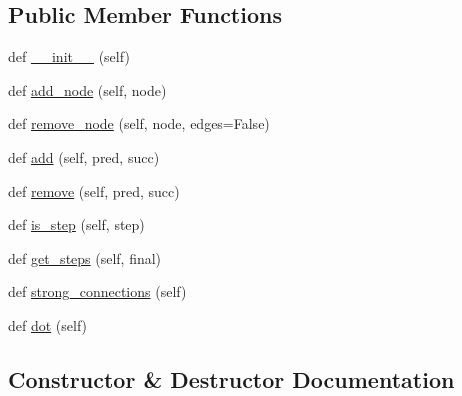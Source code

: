 \subsection*{Public Member Functions}
\begin{DoxyCompactItemize}
\item 
def \hyperlink{classpip_1_1__vendor_1_1distlib_1_1util_1_1Sequencer_af2a6b5cfce15112bafad00ed20bbfcce}{\+\_\+\+\_\+init\+\_\+\+\_\+} (self)
\item 
def \hyperlink{classpip_1_1__vendor_1_1distlib_1_1util_1_1Sequencer_a0ded535de1742bae3f41bfe634e74a4e}{add\+\_\+node} (self, node)
\item 
def \hyperlink{classpip_1_1__vendor_1_1distlib_1_1util_1_1Sequencer_a23f9b0df51114ed834d6ebb1e8c2fe07}{remove\+\_\+node} (self, node, edges=False)
\item 
def \hyperlink{classpip_1_1__vendor_1_1distlib_1_1util_1_1Sequencer_a233a50f436076c741b223f7fe801f53e}{add} (self, pred, succ)
\item 
def \hyperlink{classpip_1_1__vendor_1_1distlib_1_1util_1_1Sequencer_af1206b90512098b35d600386081d5a9a}{remove} (self, pred, succ)
\item 
def \hyperlink{classpip_1_1__vendor_1_1distlib_1_1util_1_1Sequencer_afb1d883bb4dcdb6bd19389bbd5d7f4e6}{is\+\_\+step} (self, step)
\item 
def \hyperlink{classpip_1_1__vendor_1_1distlib_1_1util_1_1Sequencer_ac8be86d47cbb15c49b7b4820c3e5b303}{get\+\_\+steps} (self, final)
\item 
def \hyperlink{classpip_1_1__vendor_1_1distlib_1_1util_1_1Sequencer_a07dd766dcb58ed14077125762a7008b1}{strong\+\_\+connections} (self)
\item 
def \hyperlink{classpip_1_1__vendor_1_1distlib_1_1util_1_1Sequencer_a466d0da321bb570776c5fac8f28e8472}{dot} (self)
\end{DoxyCompactItemize}


\subsection{Constructor \& Destructor Documentation}
\mbox{\label{classpip_1_1__vendor_1_1distlib_1_1util_1_1Sequencer_af2a6b5cfce15112bafad00ed20bbfcce}} 
